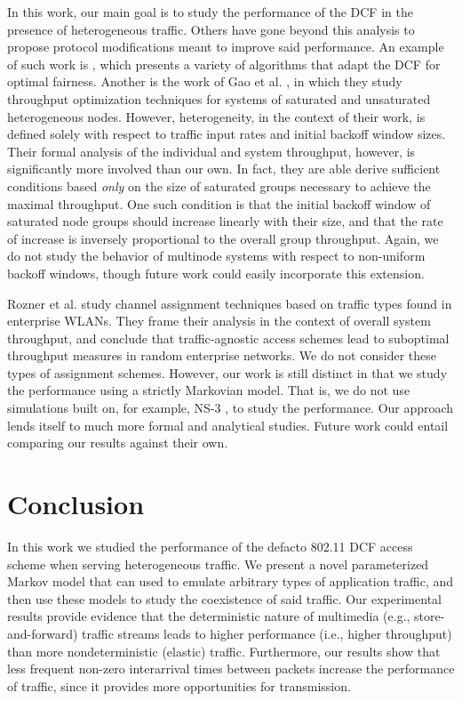 \documentclass[conference]{IEEEtran}
\begin{document}
In this work, our main goal is to study the performance of the DCF in the presence of heterogeneous traffic. Others have gone beyond this analysis to propose protocol modifications meant to improve said performance. An example of such work is \cite{li2008predictable}, which presents a variety of algorithms that adapt the DCF for optimal fairness. Another is the work of Gao et al. \cite{gao2013throughput}, in which they study throughput optimization techniques for systems of saturated and unsaturated heterogeneous nodes. However, heterogeneity, in the context of their work, is defined solely with respect to traffic input rates and initial backoff window sizes. Their formal analysis of the individual and system throughput, however, is significantly more involved than our own. In fact, they are able derive sufficient conditions based \emph{only} on the size of saturated groups necessary to achieve the maximal throughput. One such condition is that the initial backoff window of saturated node groups should increase linearly with their size, and that the rate of increase is inversely proportional to the overall group throughput. Again, we do not study the behavior of multinode systems with respect to non-uniform backoff windows, though future work could easily incorporate this extension.

Rozner et al. \cite{rozner2007traffic} study channel assignment techniques based on traffic types found in enterprise WLANs. They frame their analysis in the context of overall system throughput, and conclude that traffic-agnostic access schemes lead to suboptimal throughput measures in random enterprise networks. We do not consider these types of assignment schemes. However, our work is still distinct in that we study the performance using a strictly Markovian model. That is, we do not use simulations built on, for example, NS-3 \cite{henderson2008network}, to study the performance. Our approach lends itself to much more formal and analytical studies. Future work could entail comparing our results against their own.

\section{Conclusion}
In this work we studied the performance of the defacto 802.11 DCF access scheme when serving heterogeneous traffic. We present a novel parameterized Markov model that can used to emulate arbitrary types of application traffic, and then use these models to study the coexistence of said traffic. Our experimental results provide evidence that the deterministic nature of multimedia (e.g., store-and-forward) traffic streams leads to higher performance (i.e., higher throughput) than more nondeterministic (elastic) traffic. Furthermore, our results show that less frequent non-zero interarrival times between packets increase the performance of traffic, since it provides more opportunities for transmission.




\end{document}
